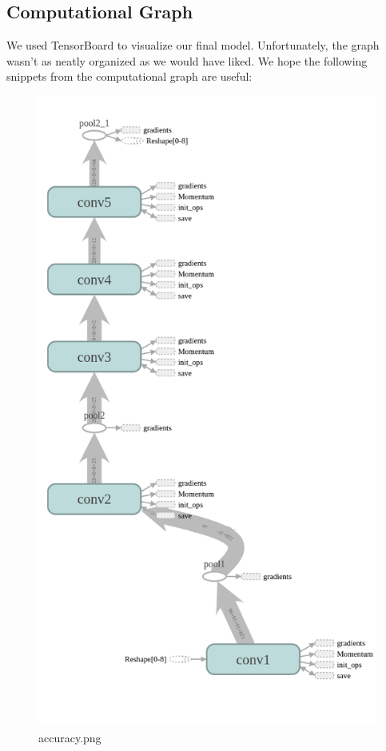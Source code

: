 \documentclass[10pt]{article} %
\begin{document}
	\subsection{Computational Graph}
	We used TensorBoard to visualize our final model. Unfortunately, the graph wasn't as neatly organized as we would have liked. We hope the following snippets from the computational graph are useful:
	\begin{figure}[htbp,width=0.5em]
		\centering
		\includegraphics{./figures/graph-1.png}
		\caption{accuracy.png}
	\end{figure}
	
	
\end{document}
